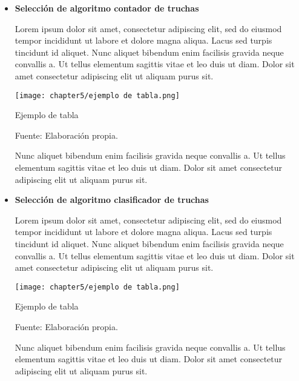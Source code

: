 \begin{itemize}
	
	\item \textbf{Selección de algoritmo contador de truchas} 
	
	Lorem ipsum dolor sit amet, consectetur adipiscing elit, sed do eiusmod tempor incididunt ut labore et dolore magna aliqua. Lacus sed turpis tincidunt id aliquet. Nunc aliquet bibendum enim facilisis gravida neque convallis a. Ut tellus elementum sagittis vitae et leo duis ut diam. Dolor sit amet consectetur adipiscing elit ut aliquam purus sit.
	
	\begin{myfigure}[H]
		\centering
		\texttt{[image: chapter5/ejemplo de tabla.png]}
		\caption{Ejemplo de tabla}
		\begin{myflushleftportland}
			Fuente: Elaboración propia.
		\end{myflushleftportland}
		\label{fig:ejemplo de tabla}
	\end{myfigure}

	Nunc aliquet bibendum enim facilisis gravida neque convallis a. Ut tellus elementum sagittis vitae et leo duis ut diam. Dolor sit amet consectetur adipiscing elit ut aliquam purus sit.
	
	\item \textbf{Selección de algoritmo clasificador de truchas} 
	
	Lorem ipsum dolor sit amet, consectetur adipiscing elit, sed do eiusmod tempor incididunt ut labore et dolore magna aliqua. Lacus sed turpis tincidunt id aliquet. Nunc aliquet bibendum enim facilisis gravida neque convallis a. Ut tellus elementum sagittis vitae et leo duis ut diam. Dolor sit amet consectetur adipiscing elit ut aliquam purus sit.
	
	\begin{myfigure}[H]
		\centering
		\texttt{[image: chapter5/ejemplo de tabla.png]}
		\caption{Ejemplo de tabla}
		\begin{myflushleftportland}
			Fuente: Elaboración propia.
		\end{myflushleftportland}
		\label{fig:ejemplo de tabla}
	\end{myfigure}
	
	Nunc aliquet bibendum enim facilisis gravida neque convallis a. Ut tellus elementum sagittis vitae et leo duis ut diam. Dolor sit amet consectetur adipiscing elit ut aliquam purus sit.
	
\end{itemize}

